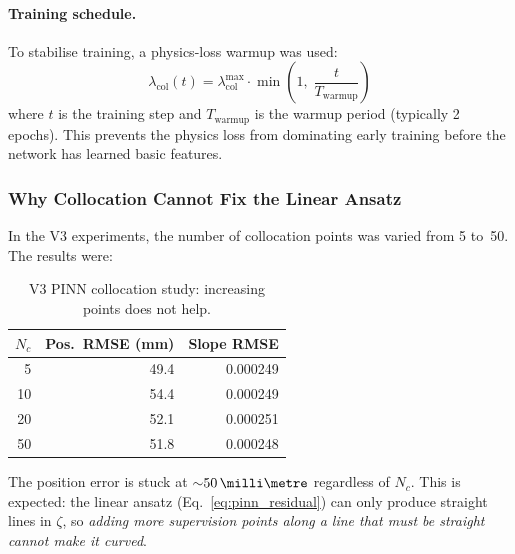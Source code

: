 \documentclass[11pt,a4paper]{article}
\newcommand{\SI}[2]{#1\,\text{#2}}
\newcommand{\zfrac}{\zeta}
\begin{document}
\paragraph{Training schedule.}
To stabilise training, a physics-loss warmup was used:
\begin{equation}\label{eq:warmup}
  \lambda_{\mathrm{col}}(t) = \lambda_{\mathrm{col}}^{\max}
  \cdot\min\!\left(1,\;\frac{t}{T_{\mathrm{warmup}}}\right)
\end{equation}
where $t$ is the training step and $T_{\mathrm{warmup}}$ is the warmup
period (typically 2 epochs).  This prevents the physics loss from
dominating early training before the network has learned basic features.

\subsubsection{Why Collocation Cannot Fix the Linear Ansatz}
\label{sec:col_cant_fix}

In the V3 experiments, the number of collocation points was varied from
5 to~50.  The results were:
\begin{table}[H]
\centering
\caption{V3 PINN collocation study: increasing points does not help.}
\label{tab:collocation}
\begin{tabular}{@{} r r r @{}}
\toprule
$N_c$ & Pos.\ RMSE (mm) & Slope RMSE \\
\midrule
  5 & 49.4 & 0.000249 \\
 10 & 54.4 & 0.000249 \\
 20 & 52.1 & 0.000251 \\
 50 & 51.8 & 0.000248 \\
\bottomrule
\end{tabular}
\end{table}

The position error is stuck at ${\sim}\SI{50}{\milli\metre}$ regardless of
$N_c$.  This is expected: the linear ansatz
(Eq.~\ref{eq:pinn_residual}) can only produce straight lines in $\zfrac$,
so \emph{adding more supervision points along a line that must be straight
cannot make it curved}.
\end{document}
